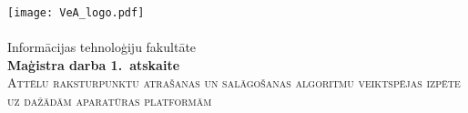 \begin{titlepage}
	\newsavebox{\veatext}
	\newlength{\veatextwidth}
	\settowidth{\veatextwidth}{\usebox{\veatext}}
	\centering\texttt{[image: VeA\_logo.pdf]}\\[4pt]
	\usebox{\veatext}\\[6pt]
	\large Informācijas tehnoloģiju fakultāte\\[2cm]
	
	\textbf{Maģistra darba 1.~atskaite}\\[1.5cm]
	
	\textsc{\Large Attēlu raksturpunktu atrašanas un salāgošanas algoritmu veiktspējas izpēte uz dažādām aparatūras platformām}
	\vfill %
	

\end{titlepage}
